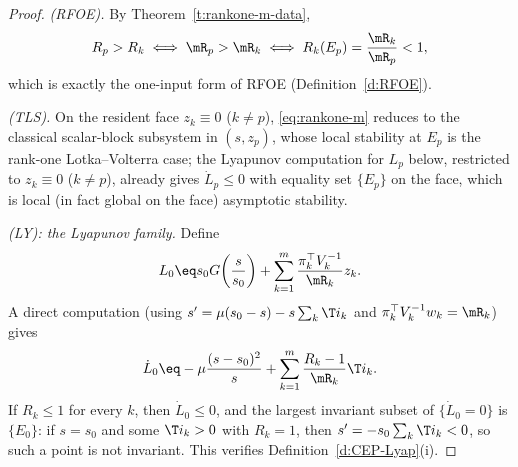 \begin{proof}
\emph{(RFOE).} By Theorem~\ref{t:rankone-m-data},
\[
R_p>R_k
\;\Longleftrightarrow\;
\mR_p>\mR_k
\;\Longleftrightarrow\;
R_k(E_p)=\frac{\mR_k}{\mR_p}<1,
\]
which is exactly the one-input form of RFOE (Definition~\ref{d:RFOE}).

\smallskip
\noindent\emph{(TLS).} On the resident face $z_k\equiv0$ ($k\ne p$),
\eqref{eq:rankone-m} reduces to the classical scalar-block subsystem
in $(s,z_p)$, whose local stability at $E_p$ is the rank-one Lotka--Volterra
case; the Lyapunov computation for $L_p$ below, restricted to
$z_k\equiv0$ ($k\ne p$), already gives $\dot L_p\le0$ with equality
set $\{E_p\}$ on the face, which is local (in fact global on the
face) asymptotic stability.

\smallskip
\noindent\emph{(LY): the Lyapunov family.}
Define
\[
L_0
\eq
s_0G\!\left(\frac{s}{s_0}\right)
+
\sum_{k=1}^m
\frac{\pi_k^\top V_k^{-1}}{\mR_k}z_k.
\]
A direct computation (using $s'=\mu(s_0-s)-s\sum_k\T i_k$ and
$\pi_k^\top V_k^{-1}w_k=\mR_k$) gives
\[
\dot L_0
\eq
-\mu\frac{(s-s_0)^2}{s}
+
\sum_{k=1}^m
\frac{R_k-1}{\mR_k}\T i_k.
\]
If $R_k\le1$ for every $k$, then $\dot L_0\le0$, and the largest
invariant subset of $\{\dot L_0=0\}$ is $\{E_0\}$: if $s=s_0$ and some
$\T i_k>0$ with $R_k=1$, then $s'=-s_0\sum_k\T i_k<0$, so such a point
is not invariant. This verifies Definition~\ref{d:CEP-Lyap}(i).


\end{proof}
